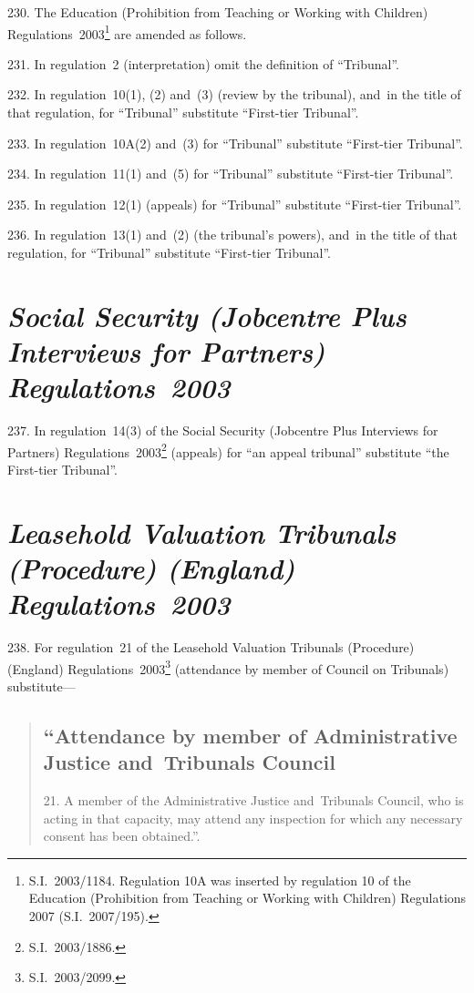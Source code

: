 \documentclass[12pt,a4paper]{article}
\begin{document}
230.  The Education (Prohibition from Teaching or Working with Children) Regulations~2003\footnote{S.I.~2003/1184. Regulation 10A was inserted by regulation 10 of the Education (Prohibition from Teaching or Working with Children) Regulations 2007 (S.I.~2007/195).} are amended as follows.

\medskip

231.  In regulation~2 (interpretation) omit the definition of “Tribunal”.

\medskip

232.  In regulation~10(1), (2) and~(3) (review by the tribunal), and~in the title of that regulation, for “Tribunal” substitute “First-tier Tribunal”.

\medskip

233.  In regulation~10A(2) and~(3) for “Tribunal” substitute “First-tier Tribunal”.

\medskip

234.  In regulation~11(1) and~(5) for “Tribunal” substitute “First-tier Tribunal”.

\medskip

235.  In regulation~12(1) (appeals) for “Tribunal” substitute “First-tier Tribunal”.

\medskip

236.  In regulation~13(1) and~(2) (the tribunal’s powers), and~in the title of that regulation, for “Tribunal” substitute “First-tier Tribunal”.

\section*{\itshape\sloppy Social Security (Jobcentre Plus Interviews for Partners) Regulations~2003}

237.  In regulation~14(3) of the Social Security (Jobcentre Plus Interviews for Partners) Regulations~2003\footnote{S.I.~2003/1886.} (appeals) for “an appeal tribunal” substitute “the First-tier Tribunal”.

\section*{\itshape\sloppy{} Leasehold Valuation Tribunals (Procedure) (England) Regulations~2003}

238.  For regulation~21 of the Leasehold Valuation Tribunals (Procedure) (England) Regulations~2003\footnote{S.I.~2003/2099.} (attendance by member of Council on Tribunals) substitute—
\begin{quotation}
\subsection*{“Attendance by member of Administrative Justice and~Tribunals Council}

21.  A member of the Administrative Justice and~Tribunals Council, who is acting in that capacity, may attend any inspection for which any necessary consent has been obtained.”.
\end{quotation}
\end{document}
